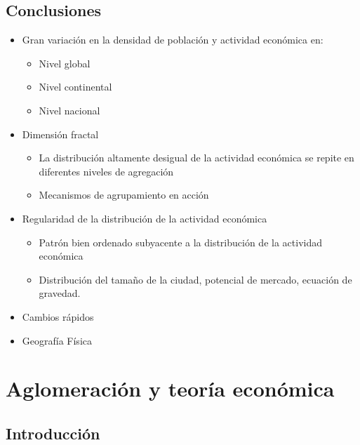 \section{Conclusiones}

\begin{itemize}
    \item Gran variación en la densidad de población y actividad económica en:
	\begin{itemize}
	    \item Nivel global 
	    \item Nivel continental 
	    \item Nivel nacional
	\end{itemize}
    \item Dimensión fractal
	\begin{itemize}
	    \item La distribución altamente desigual de la actividad económica se repite en diferentes niveles de agregación 
	    \item Mecanismos de agrupamiento en acción
	\end{itemize}
    \item Regularidad de la distribución de la actividad económica
	\begin{itemize}
	    \item Patrón bien ordenado subyacente a la distribución de la actividad económica 
	    \item Distribución del tamaño de la ciudad, potencial de mercado, ecuación de gravedad.
	\end{itemize}
    \item Cambios rápidos
    \item Geografía Física
\end{itemize}

\chapter{Aglomeración y teoría económica}

\section{Introducción}

